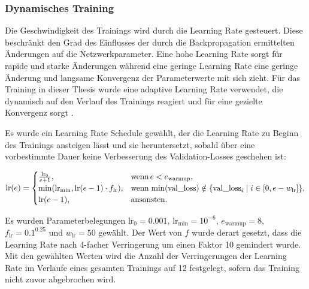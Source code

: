 \subsubsection{Dynamisches Training}

Die Geschwindigkeit des Trainings wird durch die Learning Rate gesteuert. Diese beschränkt den Grad des Einflusses der durch die Backpropagation ermittelten Änderungen auf die Netzwerkparameter. Eine hohe Learning Rate sorgt für rapide und starke Änderungen während eine geringe Learning Rate eine geringe Änderung und langsame Konvergenz der Parameterwerte mit sich zieht. Für das Training in dieser Thesis wurde eine adaptive Learning Rate verwendet, die dynamisch auf den Verlauf des Trainings reagiert und für eine gezielte Konvergenz sorgt \cite{adaptive_lr_schedule}.

Es wurde ein Learning Rate Schedule gewählt, der die Learning Rate zu Beginn des Trainings ansteigen lässt und sie heruntersetzt, sobald über eine vorbestimmte Dauer keine Verbesserung des Validation-Losses geschehen ist:

\begin{equation*}
    \text{lr}(e) =
    \begin{cases}
        \frac{\text{lr}_0}{e+1},                            & \text{wenn\,} e < e_\text{warmup},                                                     \\
        \min(\text{lr}_\text{min}, \text{lr}(e-1) \cdot f_\text{lr}), & \text{wenn\,} \min(\text{val\_loss}) \notin \{\text{val\_loss}_i \mid i \in [0,e-w_\text{lr}]\}, \\
        \text{lr}(e-1),                                     & \text{ansonsten.}
    \end{cases}
\end{equation*}

Es wurden Parameterbelegungen $\text{lr}_0 = 0.001$, $\text{lr}_\text{min} = 10^{-6}$, $e_\text{warmup} = 8$, $f_\text{lr} = 0.1^{0.25}$ und $w_\text{lr} = 50$ gewählt. Der Wert von $f$ wurde derart gesetzt, dass die Learning Rate nach 4-facher Verringerung um einen Faktor 10 gemindert wurde. Mit den gewählten Werten wird die Anzahl der Verringerungen der Learning Rate im Verlaufe eines gesamten Trainings auf 12 festgelegt, sofern das Training nicht zuvor abgebrochen wird.

